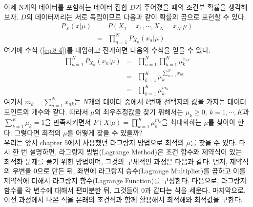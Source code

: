 \documentclass[a4paper]{oblivoir}
\begin{document}
이제 N개의 데이터를 포함하는 데이터 집합 $D$가 주어졌을 때의 조건부 확률을 생각해보자. $D$의 데이터끼리는 서로 독립이므로 다음과 같이 확률의 곱으로 표현할 수 있다. 
\begin{eqnarray}
P_{X}(x|\mu) & = & P(X_{1}=x_{1},\cdots,X_{N}=x_{N}|\mu) \nonumber \\
& = &  \prod_{n=1}^{N} P_{X_{n}}(x_{n}|\mu) \label{eq:8-5}
\end{eqnarray}
여기에 수식 (\ref{eq:8-4})를 대입하고 전개하면 다음의 수식을 얻을 수 있다. 
\begin{eqnarray}
\prod_{n=1}^{N} P_{X_{n}}(x_{n}|\mu) & = & \prod_{n=1}^{N} \prod_{k=1}^{K} \mu_{k}^{x_{nk}} \nonumber \\
& = &  \prod_{k=1}^{K} \mu_{k}^{\sum_{n=1}^{N} x_{nk}} \nonumber \\
& = &  \prod_{k=1}^{K} \mu_{k}^{m_k} \label{eq:8-6}
\end{eqnarray}
여기서 $m_k=\sum_{n=1}^{N} x_{nk}$는 $N$개의 데이터 중에서 $k$번째 선택지의 값을 가지는 데이터 포인트의 개수와 같다. 따라서 $\mu$의 최우추정값을 찾기 위해서는 $\mu_k \geq 0, \ k=1,\cdots,K$과 $\sum_{k=1}^{K} \mu_k = 1$을 만족시키면서 $P(X|\mu)=\prod_{k=1}^{K} \mu_{k}^{m_k}$을 최대화하는 $\mu$를 찾아야 한다. 그렇다면 최적의 $\mu$를 어떻게 찾을 수 있을까? \\

우리는 앞서 chapter 5에서 사용했던 라그랑지 방법으로 최적의 $\mu$를 찾을 수 있다. 다시 한 번 설명하면, 라그랑지 방법(Lagrange Method)은 조건 함수와 제약식이 있는 최적화 문제를 풀기 위한 방법이며, 그것의 구체적인 과정은 다음과 같다. 먼저, 제약식의 우변을 0으로 만든 뒤, 좌변에 라그랑지 승수(Lagrange Multiplier)를 곱하고 이를 제약식에 더해서 라그랑지 함수(Lagrange Function)를 구성한다. 다음으로, 라그랑지 함수를 각 변수에 대해서 편미분한 뒤, 그것들이 0과 같다는 식을 세운다. 마지막으로, 이전 과정에서 나온 식을 본래의 조건식과 함께 활용해서 최적해와 최적값을 구한다. \\
\end{document}
